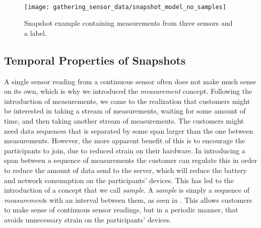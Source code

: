 \\
\begin{figure}[!htbp]
    \centering
    \texttt{[image: gathering\_sensor\_data/snapshot\_model\_no\_samples]}
    \caption{Snapshot example containing measurements from three sensors and a label.}
    \label{fig:snapshot_model_no_samples}
\end{figure}
\FloatBarrier



\subsection{Temporal Properties of Snapshots}
\label{sec:temporal_properties_of_snapshots}




A single sensor reading from a continuous sensor often does not make much sense on its own, which is why we introduced the \emph{measurement} concept. Following the introduction of measurements, we came to the realization that customers might be interested in taking a stream of measurements, waiting for some amount of time, and then taking another stream of measurements. The customers might need data sequences that is separated by some span larger than the one between measurements. However, the more apparent benefit of this is to encourage the participants to join, due to reduced strain on their hardware. In introducing a span between a sequence of measurements the customer can regulate this in order to reduce the amount of data send to the server, which will reduce the battery and network consumption on the participants' devices. This has led to the introduction of a concept that we call \emph{sample}. A \emph{sample} is simply a sequence of \emph{measurement}s with an interval between them, as seen in . This allows customers to make sense of continuous sensor readings, but in a periodic manner, that avoids unnecessary strain on the participants' devices.

